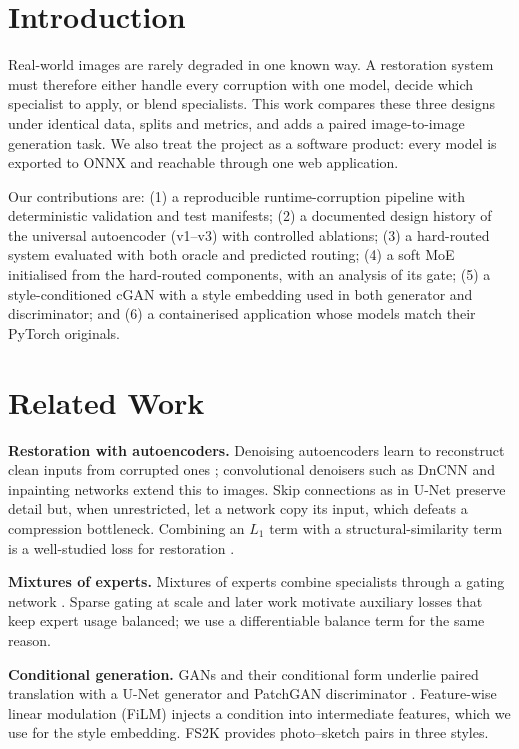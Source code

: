 \documentclass[conference]{IEEEtran}
\begin{document}
\section{Introduction}
Real-world images are rarely degraded in one known way. A restoration system must therefore either handle every corruption with one model, decide which specialist to apply, or blend specialists. This work compares these three designs under identical data, splits and metrics, and adds a paired image-to-image generation task. We also treat the project as a software product: every model is exported to ONNX and reachable through one web application.

Our contributions are: (1) a reproducible runtime-corruption pipeline with deterministic validation and test manifests; (2) a documented design history of the universal autoencoder (v1--v3) with controlled ablations; (3) a hard-routed system evaluated with both oracle and predicted routing; (4) a soft MoE initialised from the hard-routed components, with an analysis of its gate; (5) a style-conditioned cGAN with a style embedding used in both generator and discriminator; and (6) a containerised application whose models match their PyTorch originals.

\section{Related Work}
\textbf{Restoration with autoencoders.} Denoising autoencoders learn to reconstruct clean inputs from corrupted ones \cite{vincent2008}; convolutional denoisers such as DnCNN \cite{zhang2017dncnn} and inpainting networks \cite{pathak2016} extend this to images. Skip connections as in U-Net \cite{ronneberger2015} preserve detail but, when unrestricted, let a network copy its input, which defeats a compression bottleneck. Combining an $L_1$ term with a structural-similarity term is a well-studied loss for restoration \cite{zhao2017loss,wang2004ssim}.

\textbf{Mixtures of experts.} Mixtures of experts combine specialists through a gating network \cite{jacobs1991}. Sparse gating at scale \cite{shazeer2017} and later work \cite{fedus2022} motivate auxiliary losses that keep expert usage balanced; we use a differentiable balance term for the same reason.

\textbf{Conditional generation.} GANs \cite{goodfellow2014} and their conditional form \cite{mirza2014} underlie paired translation with a U-Net generator and PatchGAN discriminator \cite{isola2017}. Feature-wise linear modulation (FiLM) \cite{perez2018} injects a condition into intermediate features, which we use for the style embedding. FS2K \cite{fan2022fs2k} provides photo--sketch pairs in three styles.
\end{document}
